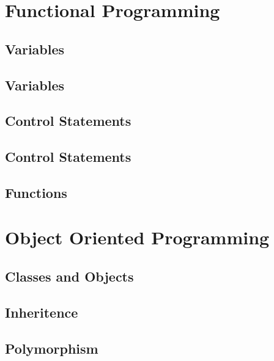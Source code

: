 \documentclass[10pt,a4paper,titlepage]{book}
\begin{document}
\chapter{Functional Programming}

\vfill
\pagebreak
\section{Variables}

\vfill
\pagebreak
\section{Variables~}

\vfill
\pagebreak
\section{Control Statements}

\vfill
\pagebreak
\section{Control Statements~}

\vfill
\pagebreak
\section{Functions}

\vfill
\pagebreak
\chapter{Object Oriented Programming}

\vfill
\pagebreak
\section{Classes and Objects}

\vfill
\pagebreak
\section{Inheritence}

\vfill
\pagebreak
\section{Polymorphism}

\vfill
\pagebreak
\end{document}
